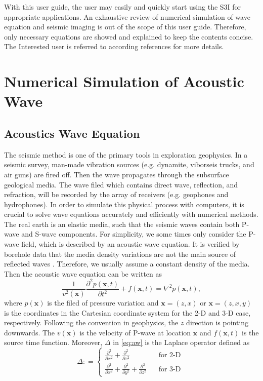 \documentclass[11pt,titlepage]{article}
\newcommand{\bx}{\boldsymbol{x}}
\theoremstyle{plain}
\theoremstyle{definition}
\theoremstyle{remark}
\numberwithin{equation}{section}
\begin{document}
With this user guide, the user may easily and quickly start using the S3I for appropriate applications. An exhaustive review of numerical simulation of wave equation and seismic imaging is out of the scope of this user guide. Therefore, only necessary equations are showed and explained to keep the contents concise. The Interested user is referred to according references for more details.  



\section{Numerical Simulation of Acoustic Wave}


\subsection{Acoustics Wave Equation}
The seismic method is one of the primary tools in exploration geophysics. In a seismic survey, man-made vibration sources (e.g. dynamite, viborseis trucks, and air guns) are fired off. Then the wave propagates through the subsurface geological media. The wave filed which contains direct wave, reflection, and refraction, will be recorded by the array of receivers (e.g. geophones and hydrophones). In order to simulate this physical process with computers, it is crucial to solve wave equations accurately and efficiently with numerical methods. The real earth is an elastic media, such that the seismic waves contain both P-wave and S-wave components. For simplicity, we some times only consider the P-wave field, which is described by an acoustic wave equation. It is verified by borehole data that the media density variations are not the main source of reflected waves \cite{Hood:1981aa}. Therefore, we usually assume a constant density of the media. Then the acoustic wave equation can be written as
\begin{equation}\label{eq:aw}
\frac{1}{v^2(\bx)}\frac{\partial^2 p(\bx, t)}{\partial t^2} + f(\bx, t) = \nabla^2 p(\bx, t),
\end{equation}
where $p(\bx)$ is the filed of pressure variation and $\bx=(z,x)$ or $\bx=(z,x,y)$ is the coordinates in the Cartesian coordinate system for the 2-D and 3-D case, respectively. Following the convention in geophysics, the $z$ direction is pointing downwards. The $v(\bx)$ is the velocity of P-wave at location $\bx$ and $f(\bx,t)$ is the source time function. Moreover, $\Delta$ in \eqref{eq:aw} is the Laplace operator defined as 
\begin{equation}
\Delta: =\left\{
\begin{aligned}
\frac{\partial^2}{\partial x^2}+\frac{\partial^2}{\partial z^2}~~~~~~~ & ~~~~\text{for 2-D }\\
\frac{\partial^2}{\partial x^2}+\frac{\partial^2}{\partial y^2}+\frac{\partial^2}{\partial z^2} &~~~~ \text{for 3-D}
\end{aligned}
\right.  
\end{equation}
\end{document}
